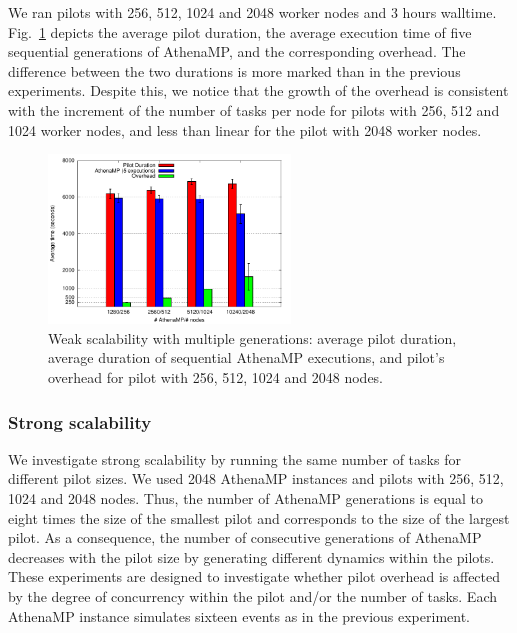We ran pilots with 256, 512, 1024 and 2048 worker nodes and 3 hours
walltime. Fig.~\ref{fig:weakScal2a} depicts the average pilot duration, the
average execution time of five sequential generations of AthenaMP, and the
corresponding overhead. The difference between the two durations
is more marked than in the previous experiments. Despite this, we notice that
the growth of the overhead is consistent with the increment of the number of
tasks per node for pilots with 256, 512 and 1024 worker nodes, and less than
linear for the pilot with 2048 worker nodes.

\begin{figure}[!t]
        \includegraphics[height=4.5cm,width=\columnwidth]{./figures/NGE/weak2.pdf}
        \vspace{-0.3in}
    \caption{Weak scalability with multiple generations: average pilot
    duration, average duration of sequential AthenaMP executions, and
    pilot's overhead for pilot with 256, 512, 1024 and 2048 nodes.}
\label{fig:weakScal2a}
\end{figure}


\subsubsection{Strong scalability}

We investigate strong scalability by running the same number of
tasks for different pilot sizes. We used 2048 AthenaMP instances and  pilots
with 256, 512, 1024 and 2048 nodes. Thus, the number of AthenaMP generations is
equal to eight times the size of the smallest pilot and corresponds to the size
of the largest pilot. As a consequence, the number of consecutive generations of
AthenaMP decreases with the pilot size by generating different dynamics within
the pilots. These experiments are designed to investigate whether pilot overhead
is affected by the degree of concurrency within the pilot and/or the number of
tasks. Each AthenaMP instance simulates sixteen events as in the previous
experiment.

